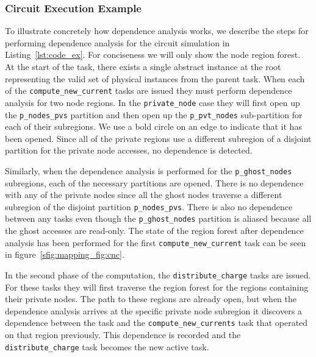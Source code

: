 \subsubsection{Circuit Execution Example}
\label{subsec:cirdependence}
To illustrate concretely how dependence analysis works, we describe the steps for
performing dependence analysis for the circuit simulation in Listing~\ref{lst:code_ex}.
For conciseness we will only show the node region forest.  At the start of the task, there exists
a single abstract instance at the root representing the valid set of physical
instances from the parent task. 
When each of the {\tt compute\_new\_current} tasks are issued they must perform dependence
analysis for two node regions.  In the {\tt private\_node} case they will first open
up the {\tt p\_nodes\_pvs} partition and then open up the {\tt p\_pvt\_nodes} sub-partition
for each of their subregions.  We use a bold circle on an edge to indicate that it has been
opened.  Since all of the private regions use a different subregion
of a disjoint partition for the private node accesses, no dependence is detected.  

Similarly, when the dependence analysis is performed for the {\tt p\_ghost\_nodes} subregions,
each of the necessary partitions are opened.  There is no dependence with any of the private
nodes since all the ghost nodes traverse a different subregion of the disjoint partition
{\tt p\_nodes\_pvs}.  There is also no dependence between any tasks even though the
{\tt p\_ghost\_nodes} partition is aliased because all the ghost accesses are read-only.
The state of the region forest after dependence analysis has been performed for the first
{\tt compute\_new\_current} task can be seen in figure~\ref{sfig:mapping_fig:cnc}.

In the second phase of the computation, the {\tt distribute\_charge} tasks
are issued.  For these tasks they will first traverse the region forest
for the regions containing their private nodes.  The path to these regions are
already open, but when the dependence analysis arrives at the specific private node subregion it 
discovers a dependence between the task and the {\tt compute\_new\_currents} task that operated
on that region previously.  This dependence is recorded and the 
{\tt distribute\_charge} task becomes the new active task.

